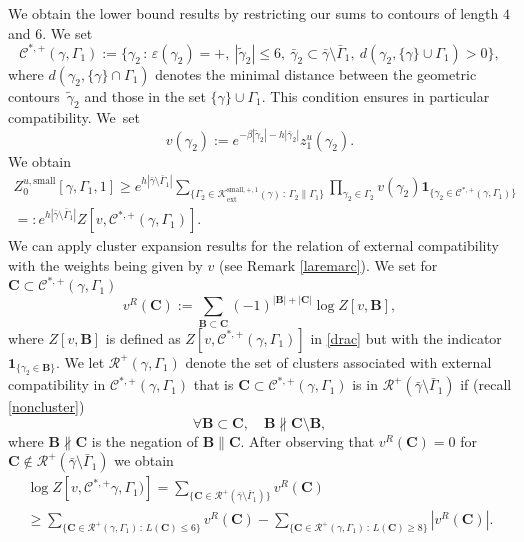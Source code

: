 \documentclass[10pt]{amsart}
\let\mathcal\mathscr
\newcommand{\sep}{\,:\,}
\numberwithin{equation}{section}
\theoremstyle{plain}
\theoremstyle{definition}
\newcommand{\ext}{\mathrm{ext}}
\newcommand{\sm}{\mathrm{small}}
\newcommand{\ind}{\mathbf{1}}
\newcommand{\cC}{{\ensuremath{\mathcal C}} }
\newcommand{\cR}{{\ensuremath{\mathcal R}} }
\newcommand{\cK}{{\ensuremath{\mathcal K}} }
\newcommand{\bC}{{\ensuremath{\mathbf C}} }
\newcommand{\bB}{{\ensuremath{\mathbf B}} }
\newcommand{\gb}{\beta}
\newcommand{\gep}{\varepsilon}
\newcommand{\gG}{\Gamma}
\begin{document}
We obtain the lower bound results by restricting our sums to contours of length $4$ and $6$.
We set
\begin{equation}\label{csta}
\cC^{*,+}(\gamma,\gG_1):=\{ \gamma_2 \sep \gep(\gamma_2)=+, \ |\tilde \gamma_2|\le 6,\ \bar \gamma_2\subset \bar \gamma \setminus \bar \gG_1,\
d(\gamma_2, \{\gamma\}\cup \gG_1)>0 \},
\end{equation}
where $d(\gamma_2, \{\gamma\}\cap \gG_1)$ denotes the minimal distance between the geometric contours~$\tilde \gamma_2$ and those in the set $\{\gamma\}\cup \gG_1$. This condition ensures in particular compatibility. We~set
\[
v(\gamma_2):=e^{-\gb |\tilde\gamma_2|-h|\bar \gamma_2|}
z^u_{1}(\gamma_2).
\]
We obtain
\begin{multline}\label{drac}
Z^{u,\sm}_{0}[\gamma,\gG_1,1]
\ge e^{h|\bar \gamma \setminus \bar \gG_1|} \sum_{\{ \gG_2 \in \cK^{\sm,+,1}_{\ext}(\gamma) \sep \gG_2 \parallel \gG_1\}} \prod_{\gamma_2\in \gG_2 }
v(\gamma_2)\ind_{\{\gamma_2\in \cC^{*,+}(\gamma,\gG_1)\}}\\
=:e^{h|\bar \gamma \setminus \bar \gG_1|}
Z[v,\cC^{*,+}(\gamma,\gG_1)].
\end{multline}
We can apply cluster expansion results for the relation of external compatibility with the weights being given by $v$ (see Remark \ref{laremarc}).
We set for $\bC\subset \cC^{*,+}(\gamma,\gG_1)$
\begin{equation}\label{modpot}
v^{R}(\bC):=\sum_{\bB\subset \bC} (-1)^{|\bB|+|\bC|} \log Z[v,\bB],
\end{equation}
where $Z[v,\bB]$ is defined as $Z[v,\cC^{*,+}(\gamma,\gG_1)]$ in \eqref{drac} but with the indicator $\ind_{\{\gamma_2\in \bB\}}$.
We let $\cR^+(\gamma,\gG_1)$ denote the set of clusters associated with external compatibility in $\cC^{*,+}(\gamma,\gG_1)$
that is $\bC\subset \cC^{*,+}(\gamma,\gG_1)$ is in $\cR^+(\bar \gamma\setminus\bar \gG_1)$ if (recall \eqref{noncluster})
\begin{equation*}
\forall \bB \subset \bC, \quad \bB\nparallel \bC\setminus \bB,
\end{equation*}
where $\bB\nparallel \bC$ is the negation of $\bB\parallel \bC$.
After observing that $v^{R}(\bC)=0$ for $\bC\notin \cR^+(\bar \gamma\setminus\bar \gG_1)$
we obtain
\begin{multline}\label{dox}
\log Z[v,\cC^{*,+}\gamma,\gG_1)]= \sum_{\{ \bC\in \cR^+(\bar \gamma\setminus\bar \gG_1)\}} v^R(\bC)
\\
\ge \sum_{\{ \bC\in \cR^+(\gamma, \gG_1) \sep L(\bC)\le 6\}} v^R(\bC)
-\sum_{\{ \bC\in \cR^+(\gamma, \gG_1) \sep L(\bC)\ge 8\}} \left|v^R(\bC)\right|.
\end{multline}
\end{document}
